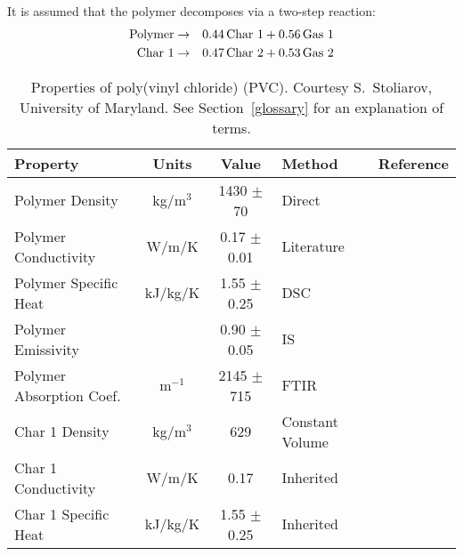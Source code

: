 It is assumed that the polymer decomposes via a two-step reaction:
\begin{eqnarray}
   \hbox{Polymer} &\to& 0.44 \, \hbox{Char 1} + 0.56 \, \hbox{Gas 1}  \\
   \hbox{Char 1}  &\to& 0.47 \, \hbox{Char 2} + 0.53 \, \hbox{Gas 2}
\end{eqnarray}


\begin{table}[h!]
\caption[Properties of poly(vinyl chloride) (PVC)]{Properties of poly(vinyl chloride) (PVC). Courtesy S.~Stoliarov, University of Maryland. See Section~\ref{glossary} for an explanation of terms.}
\begin{center}
\begin{tabular}{|l|c|c|l|l|}
\hline
Property                    & Units         & Value                             & Method                    &  Reference                                \\ \hline \hline
Polymer Density             & kg/m$^3$      & 1430 $\pm$ 70                     & Direct                    &  \cite{Stoliarov:CF2010}                  \\ \hline
Polymer Conductivity        & W/m/K         & 0.17 $\pm$ 0.01                   & Literature                &  \cite{Stoliarov:CF2010}                  \\ \hline
Polymer Specific Heat       & kJ/kg/K       & 1.55 $\pm$ 0.25                   & DSC                       &  \cite{Stoliarov:PDS2008}                 \\ \hline
Polymer Emissivity          &               & 0.90 $\pm$ 0.05                   & IS                        &  \cite{Hallman:PES1974}                   \\ \hline
Polymer Absorption Coef.    & m$^{-1}$      & 2145 $\pm$ 715                    & FTIR                      &  \cite{Tsilingiris:ECM2003}               \\ \hline
Char 1 Density              & kg/m$^3$      & 629                               & Constant Volume           &  \cite{Stoliarov:CF2010}                  \\ \hline
Char 1 Conductivity         & W/m/K         & 0.17                              & Inherited                 &  \cite{Stoliarov:CF2010}                  \\ \hline
Char 1 Specific Heat        & kJ/kg/K       & 1.55 $\pm$ 0.25                   & Inherited                 &  \cite{Stoliarov:CF2010}                  \\ \hline

\end{tabular}
\end{center}
\end{table}
